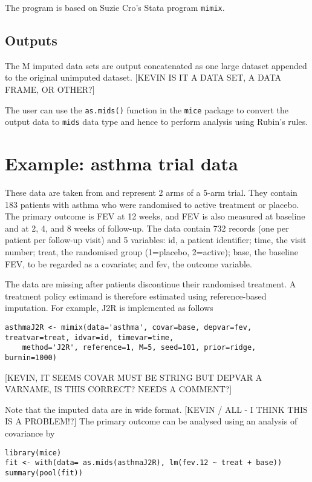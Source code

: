 The program is based on Suzie Cro’s Stata program \texttt{mimix}.

\subsection{Outputs}

The M imputed data sets are output concatenated as one large dataset appended to
the original unimputed dataset.
[KEVIN IS IT A DATA SET, A DATA FRAME, OR OTHER?] 

The user can use the \texttt{as.mids()} function in the \texttt{mice} package to convert the output data  to \texttt{mids} data type and hence to perform analysis using Rubin's rules.



\section{Example: asthma trial data}

These data are taken from \citet{Cro++16} and represent 2 arms of a 5-arm trial. 
They contain 183 patients with asthma who were randomised to active treatment or placebo. 
The primary outcome is FEV at 12 weeks, and FEV is also measured at baseline and at 2, 4, and 8 weeks of follow-up.
The data contain 732 records (one per patient per follow-up visit) and 5 variables: 
id, a patient identifier; 
time, the visit number; 
treat, the randomised group (1=placebo, 2=active); 
base, the baseline FEV, to be regarded as a covariate;
and fev, the outcome variable.

The data are missing after patients discontinue their randomised treatment. A treatment policy estimand is therefore estimated using reference-based imputation. For example, J2R is implemented as follows
\begin{verbatim}
asthmaJ2R <- mimix(data='asthma', covar=base, depvar=fev, treatvar=treat, idvar=id, timevar=time,
    method='J2R', reference=1, M=5, seed=101, prior=ridge, burnin=1000)
\end{verbatim}

[KEVIN, IT SEEMS COVAR MUST BE STRING BUT DEPVAR A VARNAME, IS THIS CORRECT? NEEDS A COMMENT?]

Note that the imputed data are in wide format. 
[KEVIN / ALL - I THINK THIS IS A PROBLEM!?]
The primary outcome can be analysed using an analysis of covariance by
\begin{verbatim}
library(mice)     
fit <- with(data= as.mids(asthmaJ2R), lm(fev.12 ~ treat + base))
summary(pool(fit))    
\end{verbatim}

